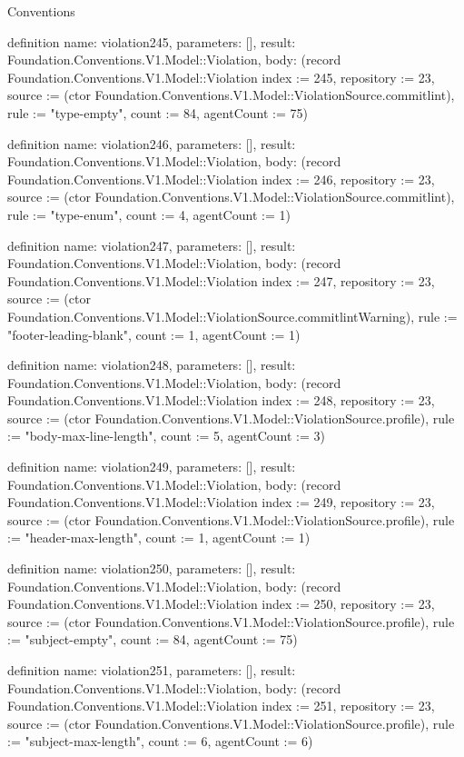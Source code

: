 \begin{lexlean}{Conventions}
\begin{semanticmodule}
definition{
  name: violation245,
  parameters: [],
  result: Foundation.Conventions.V1.Model::Violation,
  body: (record Foundation.Conventions.V1.Model::Violation {index := 245, repository := 23, source := (ctor Foundation.Conventions.V1.Model::ViolationSource.commitlint), rule := "type-empty", count := 84, agentCount := 75})
}

definition{
  name: violation246,
  parameters: [],
  result: Foundation.Conventions.V1.Model::Violation,
  body: (record Foundation.Conventions.V1.Model::Violation {index := 246, repository := 23, source := (ctor Foundation.Conventions.V1.Model::ViolationSource.commitlint), rule := "type-enum", count := 4, agentCount := 1})
}

definition{
  name: violation247,
  parameters: [],
  result: Foundation.Conventions.V1.Model::Violation,
  body: (record Foundation.Conventions.V1.Model::Violation {index := 247, repository := 23, source := (ctor Foundation.Conventions.V1.Model::ViolationSource.commitlintWarning), rule := "footer-leading-blank", count := 1, agentCount := 1})
}

definition{
  name: violation248,
  parameters: [],
  result: Foundation.Conventions.V1.Model::Violation,
  body: (record Foundation.Conventions.V1.Model::Violation {index := 248, repository := 23, source := (ctor Foundation.Conventions.V1.Model::ViolationSource.profile), rule := "body-max-line-length", count := 5, agentCount := 3})
}

definition{
  name: violation249,
  parameters: [],
  result: Foundation.Conventions.V1.Model::Violation,
  body: (record Foundation.Conventions.V1.Model::Violation {index := 249, repository := 23, source := (ctor Foundation.Conventions.V1.Model::ViolationSource.profile), rule := "header-max-length", count := 1, agentCount := 1})
}

definition{
  name: violation250,
  parameters: [],
  result: Foundation.Conventions.V1.Model::Violation,
  body: (record Foundation.Conventions.V1.Model::Violation {index := 250, repository := 23, source := (ctor Foundation.Conventions.V1.Model::ViolationSource.profile), rule := "subject-empty", count := 84, agentCount := 75})
}

definition{
  name: violation251,
  parameters: [],
  result: Foundation.Conventions.V1.Model::Violation,
  body: (record Foundation.Conventions.V1.Model::Violation {index := 251, repository := 23, source := (ctor Foundation.Conventions.V1.Model::ViolationSource.profile), rule := "subject-max-length", count := 6, agentCount := 6})
}


\end{semanticmodule}
\end{lexlean}
